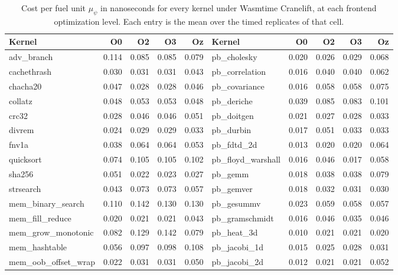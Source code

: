 \begin{table}[t]
\caption{Cost per fuel unit $\mu_\psi$ in nanoseconds for every kernel under Wasmtime Cranelift, at each frontend optimization level. Each entry is the mean over the timed replicates of that cell.}\label{tab:per_kernel_psi}
\footnotesize
\setlength{\tabcolsep}{3pt}%
\begin{adjustbox}{max width=\textwidth}%
\begin{tabular}{lrrrr|lrrrr}
\toprule
Kernel & O0 & O2 & O3 & Oz & Kernel & O0 & O2 & O3 & Oz \\
\midrule
adv\_branch & 0.114 & 0.085 & 0.085 & 0.079 & pb\_cholesky & 0.020 & 0.026 & 0.029 & 0.068 \\
cachethrash & 0.030 & 0.031 & 0.031 & 0.043 & pb\_correlation & 0.016 & 0.040 & 0.040 & 0.062 \\
chacha20 & 0.047 & 0.028 & 0.028 & 0.046 & pb\_covariance & 0.016 & 0.058 & 0.058 & 0.075 \\
collatz & 0.048 & 0.053 & 0.053 & 0.048 & pb\_deriche & 0.039 & 0.085 & 0.083 & 0.101 \\
crc32 & 0.028 & 0.046 & 0.046 & 0.051 & pb\_doitgen & 0.021 & 0.027 & 0.028 & 0.033 \\
divrem & 0.024 & 0.029 & 0.029 & 0.033 & pb\_durbin & 0.017 & 0.051 & 0.033 & 0.033 \\
fnv1a & 0.038 & 0.064 & 0.064 & 0.053 & pb\_fdtd\_2d & 0.013 & 0.020 & 0.020 & 0.064 \\
quicksort & 0.074 & 0.105 & 0.105 & 0.102 & pb\_floyd\_warshall & 0.016 & 0.046 & 0.017 & 0.058 \\
sha256 & 0.051 & 0.022 & 0.023 & 0.027 & pb\_gemm & 0.018 & 0.038 & 0.038 & 0.079 \\
strsearch & 0.043 & 0.073 & 0.073 & 0.057 & pb\_gemver & 0.018 & 0.032 & 0.031 & 0.030 \\
mem\_binary\_search & 0.110 & 0.142 & 0.130 & 0.130 & pb\_gesummv & 0.023 & 0.059 & 0.058 & 0.057 \\
mem\_fill\_reduce & 0.020 & 0.021 & 0.021 & 0.043 & pb\_gramschmidt & 0.016 & 0.046 & 0.035 & 0.046 \\
mem\_grow\_monotonic & 0.082 & 0.129 & 0.142 & 0.079 & pb\_heat\_3d & 0.010 & 0.021 & 0.021 & 0.020 \\
mem\_hashtable & 0.056 & 0.097 & 0.098 & 0.108 & pb\_jacobi\_1d & 0.015 & 0.025 & 0.028 & 0.031 \\
mem\_oob\_offset\_wrap & 0.022 & 0.031 & 0.031 & 0.050 & pb\_jacobi\_2d & 0.012 & 0.021 & 0.021 & 0.052 \\

\end{tabular}
\end{adjustbox}
\end{table}
